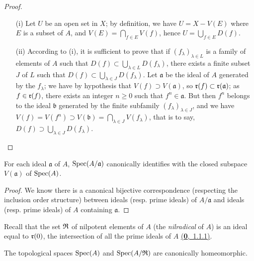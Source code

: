 \begin{proof}
\label{proof-prop-1.1.1.10}
\medskip\noindent
\begin{itemize}
  \item[(i)] Let $U$ be an open set in $X$; by definition, we have $U=X-V(E)$ where $E$ is a subset of
    $A$, and $V(E)=\bigcap_{f\in E}V(f)$, hence $U=\bigcup_{f\in E}D(f)$.
  \item[(ii)] According to (i), it is sufficient to prove that if $(f_\lambda)_{\lambda\in L}$ is a
    family of elements of $A$ such that $D(f)\subset\bigcup_{\lambda\in L}D(f_\lambda)$, there
    exists a finite subset $J$ of $L$ such that $D(f)\subset\bigcup_{\lambda\in J}D(f_\lambda)$.
    Let $\mathfrak{a}$ be the ideal of $A$ generated by the $f_\lambda$; we have by hypothesis
    that $V(f)\supset V(\mathfrak{a})$, so $\mathfrak{r}(f)\subset\mathfrak{r}(\mathfrak{a})$; as $f\in\mathfrak{r}(f)$,
    there exists an integer $n\geqslant 0$ such that $f^n\in\mathfrak{a}$. But then $f^n$ belongs
    to the ideal $\mathfrak{b}$ generated by the finite subfamily $(f_\lambda)_{\lambda\in J}$,
    and we have $V(f)=V(f^n)\supset V(\mathfrak{b})=\bigcap_{\lambda\in J}V(f_\lambda)$, that is
    to say, $D(f)\supset\bigcup_{\lambda\in J}D(f_\lambda)$.
\end{itemize}
\end{proof}

\begin{prop}[1.1.11]
\label{prop-1.1.1.11}
For each ideal $\mathfrak{a}$ of $A$, ${\mathop{\mathrm{Spec}}\nolimits}(A/\mathfrak{a})$ canonically identifies with the
closed subspace $V(\mathfrak{a})$ of ${\mathop{\mathrm{Spec}}\nolimits}(A)$.
\end{prop}

\begin{proof}
\label{proof-prop-1.1.1.11}
We know there is a canonical bijective correspondence (respecting the inclusion order
structure) between ideals (resp. prime ideals) of $A/\mathfrak{a}$ and ideals (resp. prime
ideals) of $A$ containing $\mathfrak{a}$.
\end{proof}

Recall that the set $\mathfrak{R}$ of nilpotent elements of $A$ (the {\em nilradical} of $A$) is
an ideal equal to $\mathfrak{r}(0)$, the intersection of all the prime ideals of $A$
\hyperref[env-0.1.1.1]{(\textbf{0},~1.1.1)}.

\begin{cor}[1.1.12]
\label{cor-1.1.1.12}
The topological spaces ${\mathop{\mathrm{Spec}}\nolimits}(A)$ and ${\mathop{\mathrm{Spec}}\nolimits}(A/\mathfrak{R})$ are canonically homeomorphic.
\end{cor}


